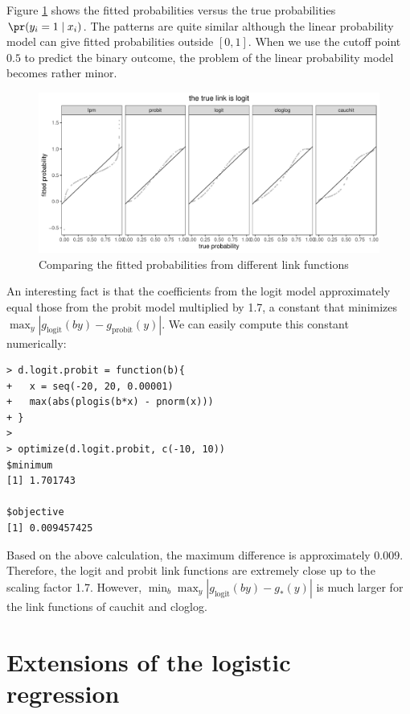  
  
Figure \ref{fig::compare-links} shows the fitted probabilities versus the true probabilities $\pr(y_i =1\mid x_i)$. The patterns are quite similar although the linear probability model can give fitted probabilities outside $[0,1]$. When we use the cutoff point $0.5$ to predict the binary outcome, the problem of the linear probability model becomes rather minor. 


\begin{figure}
\centering
\includegraphics[width = \textwidth]{figures/fittedprobabilities.pdf}
\caption{Comparing the fitted probabilities from different link functions}\label{fig::compare-links}
\end{figure}



An interesting fact is that the coefficients from the logit model approximately equal those from the probit model multiplied by 1.7, a constant that minimizes $\max_y | g_{\text{logit}}(by) - g_{\text{probit}}(y) |$. We can easily compute this constant numerically:
\begin{lstlisting}
> d.logit.probit = function(b){
+   x = seq(-20, 20, 0.00001)
+   max(abs(plogis(b*x) - pnorm(x)))
+ }
> 
> optimize(d.logit.probit, c(-10, 10))
$minimum
[1] 1.701743

$objective
[1] 0.009457425
\end{lstlisting} 
Based on the above calculation, the maximum difference is approximately 0.009. Therefore, the logit and probit link functions are extremely close up to the scaling factor 1.7. However, $\min_b \max_y | g_{\text{logit}}(by) - g_{ * }(y) |$ is much larger for the link functions of cauchit and cloglog. 




\section{Extensions of the logistic regression}

